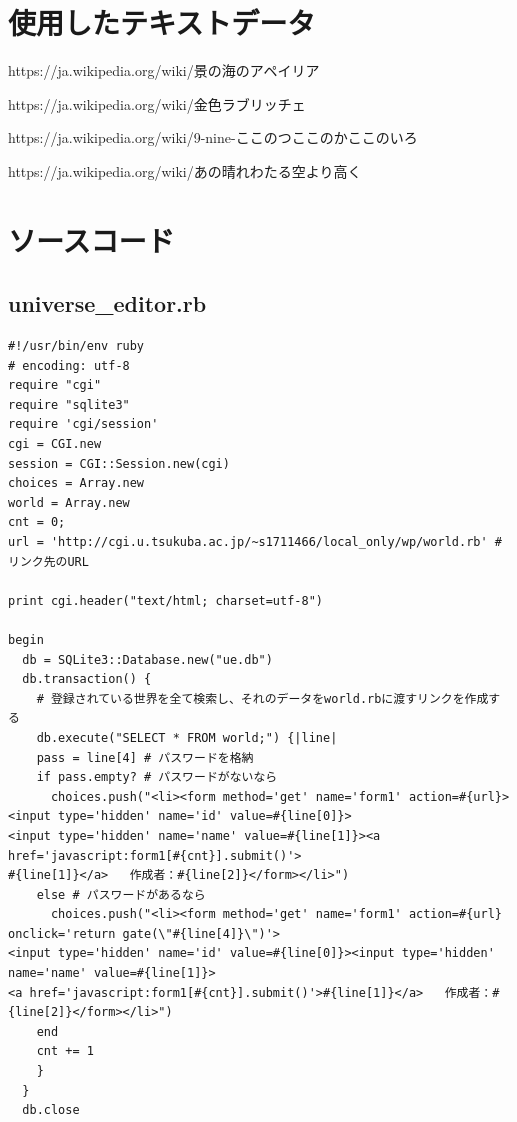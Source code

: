 \documentclass[12pt,a4paper]{jarticle}
\begin{document}
\begin{ttfamily}
\section*{使用したテキストデータ}
\par https://ja.wikipedia.org/wiki/景の海のアペイリア
\par https://ja.wikipedia.org/wiki/金色ラブリッチェ
\par https://ja.wikipedia.org/wiki/9-nine-ここのつここのかここのいろ
\par https://ja.wikipedia.org/wiki/あの晴れわたる空より高く

\newpage
\section*{ソースコード}
\subsection*{universe\_editor.rb}
\begin{oframed}
 \fontsize{8pt}{8pt}\selectfont
 \begin{verbatim}
#!/usr/bin/env ruby
# encoding: utf-8
require "cgi"
require "sqlite3"
require 'cgi/session'
cgi = CGI.new
session = CGI::Session.new(cgi)
choices = Array.new
world = Array.new
cnt = 0;
url = 'http://cgi.u.tsukuba.ac.jp/~s1711466/local_only/wp/world.rb' # リンク先のURL

print cgi.header("text/html; charset=utf-8")

begin
  db = SQLite3::Database.new("ue.db")
  db.transaction() {
    # 登録されている世界を全て検索し、それのデータをworld.rbに渡すリンクを作成する
    db.execute("SELECT * FROM world;") {|line|
    pass = line[4] # パスワードを格納
    if pass.empty? # パスワードがないなら
      choices.push("<li><form method='get' name='form1' action=#{url}><input type='hidden' name='id' value=#{line[0]}>
<input type='hidden' name='name' value=#{line[1]}><a href='javascript:form1[#{cnt}].submit()'>
#{line[1]}</a>   作成者：#{line[2]}</form></li>")
    else # パスワードがあるなら
      choices.push("<li><form method='get' name='form1' action=#{url} onclick='return gate(\"#{line[4]}\")'>
<input type='hidden' name='id' value=#{line[0]}><input type='hidden' name='name' value=#{line[1]}>
<a href='javascript:form1[#{cnt}].submit()'>#{line[1]}</a>   作成者：#{line[2]}</form></li>")
    end
    cnt += 1
    }
  }
  db.close


\end{verbatim}
\end{oframed}
\end{ttfamily}
\end{document}
